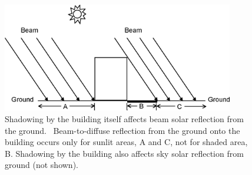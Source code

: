 \begin{figure}[hbtp] %
\centering
\includegraphics[width=0.9\textwidth, height=0.9\textheight, keepaspectratio=true]{media/image672.png}
\caption{Shadowing by the building itself affects beam solar reflection from the ground.  Beam-to-diffuse reflection from the ground onto the building occurs only for sunlit areas, A and C, not for shaded area, B. Shadowing by the building also affects sky solar reflection from ground (not shown). \protect \label{fig:shadowing-by-the-building-itself-affects-beam}}
\end{figure}
